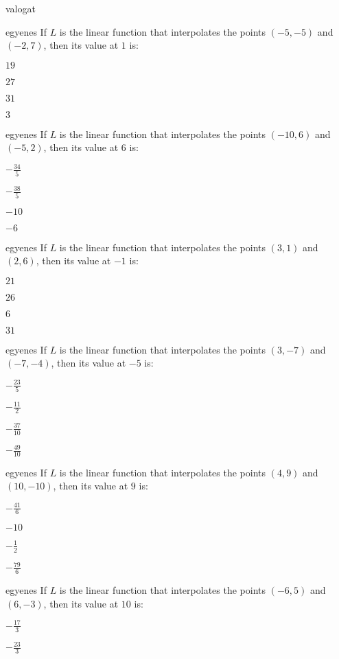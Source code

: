 \documentclass[12pt]{article}
\begin{document}
\begin{quiz}{valogat}
\begin{multi}{egyenes}
If $L$ is the linear function that interpolates the points
$(-5,-5)$ and $(-2,7)$, then its value at $1$ is:
\item* $ 19 $
\item  $ 27 $
\item  $ 31 $
\item  $ 3 $
\end{multi}
\begin{multi}{egyenes}
If $L$ is the linear function that interpolates the points
$(-10,6)$ and $(-5,2)$, then its value at $6$ is:
\item* $ -\frac{34}{5} $
\item  $ -\frac{38}{5} $
\item  $ -10 $
\item  $ -6 $
\end{multi}
\begin{multi}{egyenes}
If $L$ is the linear function that interpolates the points
$(3,1)$ and $(2,6)$, then its value at $-1$ is:
\item* $ 21 $
\item  $ 26 $
\item  $ 6 $
\item  $ 31 $
\end{multi}
\begin{multi}{egyenes}
If $L$ is the linear function that interpolates the points
$(3,-7)$ and $(-7,-4)$, then its value at $-5$ is:
\item* $ -\frac{23}{5} $
\item  $ -\frac{11}{2} $
\item  $ -\frac{37}{10} $
\item  $ -\frac{49}{10} $
\end{multi}
\begin{multi}{egyenes}
If $L$ is the linear function that interpolates the points
$(4,9)$ and $(10,-10)$, then its value at $9$ is:
\item* $ -\frac{41}{6} $
\item  $ -10 $
\item  $ -\frac{1}{2} $
\item  $ -\frac{79}{6} $
\end{multi}
\begin{multi}{egyenes}
If $L$ is the linear function that interpolates the points
$(-6,5)$ and $(6,-3)$, then its value at $10$ is:
\item* $ -\frac{17}{3} $
\item  $ -\frac{23}{3} $

\end{multi}
\end{quiz}
\end{document}
